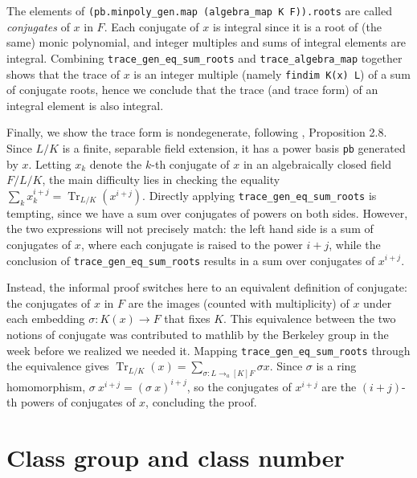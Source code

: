 \documentclass[a4paper,USenglish,cleveref, autoref, thm-restate]{lipics-v2021}
\newcommand{\lean}[1]{\texttt{#1}\xspace} %
\DeclareMathOperator{\Tr}{Tr}
\newcommand{\mathlib}{\textsf{mathlib}\xspace}
\begin{document}
The elements of \lean{(pb.minpoly\_gen.map (algebra\_map K F)).roots} are called \emph{conjugates} of $x$ in $F$.
Each conjugate of $x$ is integral since it is a root of (the same) monic polynomial,
and integer multiples and sums of integral elements are integral.
Combining \lean{trace\_gen\_eq\_sum\_roots} and \lean{trace\_algebra\_map} together shows that the trace of $x$ is an integer multiple (namely \lean{findim K(x) L}) of a sum of conjugate roots, hence we conclude that the trace (and trace form) of an integral element is also integral.

Finally, we show the trace form is nondegenerate, following \cite{Neukirch}, Proposition 2.8.
Since $L / K$ is a finite, separable field extension, it has a power basis \lean{pb} generated by $x$.
Letting $x_k$ denote the $k$-th conjugate of $x$ in an algebraically closed field $F / L / K$,
the main difficulty lies in checking the equality $\sum_k x_k^{i + j} = \Tr_{L / K} (x^{i + j})$.
Directly applying \lean{trace\_gen\_eq\_sum\_roots} is tempting, since we have a sum over conjugates of powers on both sides.
However, the two expressions will not precisely match: the left hand side is a sum of conjugates of $x$, where each conjugate is raised to the power $i + j$,
while the conclusion of \lean{trace\_gen\_eq\_sum\_roots} results in a sum over conjugates of $x^{i + j}$.

Instead, the informal proof switches here to an equivalent definition of conjugate:
the conjugates of $x$ in $F$ are the images (counted with multiplicity) of $x$ under each embedding $\sigma \colon K(x) \to F$ that fixes $K$.
This equivalence between the two notions of conjugate was contributed to \mathlib by the Berkeley group in the week before we realized we needed it.
Mapping \lean{trace\_gen\_eq\_sum\_roots} through the equivalence gives
$\Tr_{L / K}(x) = \sum_{σ : L \to_a[K] F} \sigma x$.
Since $\sigma$ is a ring homomorphism, $\sigma\ x^{i + j} = (\sigma\ x)^{i + j}$,
so the conjugates of $x^{i + j}$ are the $(i + j)$-th powers of conjugates of $x$, concluding the proof.

\section{Class group and class number} \label{sec:class-number}
\end{document}
